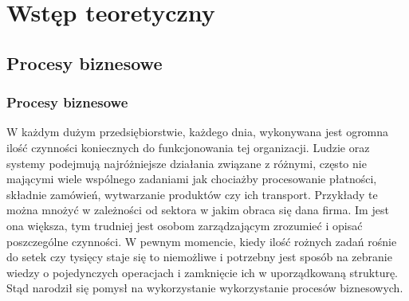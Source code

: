 \chapter{Wstęp teoretyczny}
\label{cha:wstepTeoretyczny}


\section{Procesy biznesowe}
\label{sec:procesyBiznesowe}

\subsection{Procesy biznesowe}
W każdym dużym przedsiębiorstwie, każdego dnia, wykonywana jest ogromna ilość czynności koniecznych do funkcjonowania tej organizacji. Ludzie oraz systemy podejmują najróżniejsze działania związane z różnymi, często nie mającymi wiele wspólnego zadaniami jak chociażby procesowanie płatności, składnie zamówień, wytwarzanie produktów czy ich transport. Przykłady te można mnożyć w zależności od sektora w jakim obraca się dana firma. Im jest ona większa, tym trudniej jest osobom zarządzającym zrozumieć i opisać poszczególne czynności. W pewnym momencie, kiedy ilość rożnych zadań rośnie do setek czy tysięcy staje się to niemożliwe i potrzebny jest sposób na zebranie wiedzy o pojedynczych operacjach i zamknięcie ich w uporządkowaną strukturę. Stąd narodził się pomysł na wykorzystanie wykorzystanie procesów biznesowych.

